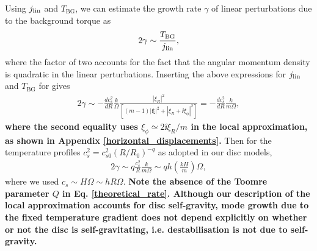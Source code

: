 Using $j_\mathrm{lin}$ and $T_\mathrm{BG}$, we can estimate the 
growth rate $\gamma$ of linear perturbations due to the background
torque as  
\begin{align}
  2\gamma \sim \frac{T_\mathrm{BG}}{j_\mathrm{lin}},
\end{align}
where the factor of two accounts for the fact that the angular momentum
density is quadratic in the linear perturbations. Inserting the above
expressions for $j_\mathrm{lin}$ and $T_\mathrm{BG}$ for gives
\begin{align}\label{theoretical_rate0}
  2\gamma \sim
  -\frac{dc_s^2}{dR}
  \frac{k}{\Omega}\frac{|\xi_R|^2}{\left[(m-1)|\bm{\xi}|^2 + |\xi_R +
      \ii\xi_\phi|^2 \right]} 
  = -\frac{dc_s^2}{dR}
  \frac{k}{m\Omega},
\end{align}
{\bf where the second equality uses $\xi_\phi \simeq
2\ii \xi_R/m$ in the local approximation, as shown in  Appendix
\ref{horizontal_displacements}.} 
Then 
for the temperature profiles $c_s^2 = c_{s0}^2 (R/R_0)^{-q}$ as
adopted in our disc models,  
\begin{align}
  2\gamma \sim q\frac{c_s^2}{R}\frac{k}{m\Omega} \sim q h
  \left(\frac{kH}{m}\right)\Omega,\label{theoretical_rate}
\end{align}
where we used $c_s\sim H\Omega\sim hR\Omega$. 
{\bf Note the absence of the Toomre parameter $Q$ in
  Eq. \ref{theoretical_rate}. Although our description of the local 
  approximation accounts for disc self-gravity, mode growth due 
  to the fixed temperature gradient does not depend explicitly on
  whether or not the disc is self-gravitating, i.e. destabilisation is
  not due to self-gravity.}   

